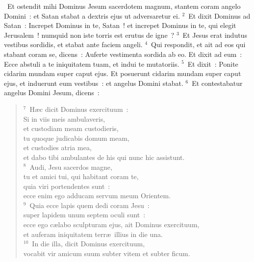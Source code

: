 ~\lettrine[lines=10,image=true,loversize=0.05,lraise=-0.03]{E}{}t ostendit mihi Dominus Jesum sacerdotem magnum, stantem coram angelo Domini~: et Satan stabat a dextris ejus ut adversaretur ei.
${}^{2}$~Et dixit Dominus ad Satan~: Increpet Dominus in te, Satan~! et increpet Dominus in te, qui elegit Jerusalem~! numquid non iste torris est erutus de igne~?
${}^{3}$~Et Jesus erat indutus vestibus sordidis, et stabat ante faciem angeli.
${}^{4}$~Qui respondit, et ait ad eos qui stabant coram se, dicens~: Auferte vestimenta sordida ab eo. Et dixit ad eum~: Ecce abstuli a te iniquitatem tuam, et indui te mutatoriis.
${}^{5}$~Et dixit~: Ponite cidarim mundam super caput ejus. Et posuerunt cidarim mundam super caput ejus, et induerunt eum vestibus~: et angelus Domini stabat.
${}^{6}$~Et contestabatur angelus Domini Jesum, dicens~:
\begin{flushleft}\begin{verse}${}^{7}$~H\ae c dicit Dominus exercituum~:\\ Si in viis meis ambulaveris,\\ et custodiam meam custodieris,\\ tu quoque judicabis domum meam,\\ et custodies atria mea,\\ et dabo tibi ambulantes de his qui nunc hic assistunt.\\
${}^{8}$~Audi, Jesu sacerdos magne,\\ tu et amici tui, qui habitant coram te,\\ quia viri portendentes sunt~:\\ ecce enim ego adducam servum meum Orientem.\\
${}^{9}$~Quia ecce lapis quem dedi coram Jesu~:\\ super lapidem unum septem oculi sunt~:\\ ecce ego c\ae labo sculpturam ejus, ait Dominus exercituum,\\ et auferam iniquitatem terr\ae\ illius in die una.\\
${}^{10}$~In die illa, dicit Dominus exercituum,\\ vocabit vir amicum suum subter vitem et subter ficum.\end{verse}\end{flushleft}


